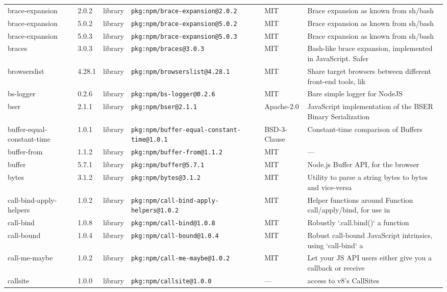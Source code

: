 \documentclass[11pt]{article}
\begin{document}
\begin{longtable}{|l|l|l|p{2.2cm}|l|p{4cm}|}
brace-expansion & 2.0.2 & library & \texttt{pkg:npm/brace-expansion@2.0.2} & MIT & Brace expansion as known from sh/bash \\
brace-expansion & 5.0.2 & library & \texttt{pkg:npm/brace-expansion@5.0.2} & MIT & Brace expansion as known from sh/bash \\
brace-expansion & 5.0.3 & library & \texttt{pkg:npm/brace-expansion@5.0.3} & MIT & Brace expansion as known from sh/bash \\
braces & 3.0.3 & library & \texttt{pkg:npm/braces@3.0.3} & MIT & Bash-like brace expansion, implemented in JavaScript. Safer  \\
browserslist & 4.28.1 & library & \texttt{pkg:npm/browserslist@4.28.1} & MIT & Share target browsers between different front-end tools, lik \\
bs-logger & 0.2.6 & library & \texttt{pkg:npm/bs-logger@0.2.6} & MIT & Bare simple logger for NodeJS \\
bser & 2.1.1 & library & \texttt{pkg:npm/bser@2.1.1} & Apache-2.0 & JavaScript implementation of the BSER Binary Serialization \\
buffer-equal-constant-time & 1.0.1 & library & \texttt{pkg:npm/buffer-equal-constant-time@1.0.1} & BSD-3-Clause & Constant-time comparison of Buffers \\
buffer-from & 1.1.2 & library & \texttt{pkg:npm/buffer-from@1.1.2} & MIT & — \\
buffer & 5.7.1 & library & \texttt{pkg:npm/buffer@5.7.1} & MIT & Node.js Buffer API, for the browser \\
bytes & 3.1.2 & library & \texttt{pkg:npm/bytes@3.1.2} & MIT & Utility to parse a string bytes to bytes and vice-versa \\
call-bind-apply-helpers & 1.0.2 & library & \texttt{pkg:npm/call-bind-apply-helpers@1.0.2} & MIT & Helper functions around Function call/apply/bind, for use in \\
call-bind & 1.0.8 & library & \texttt{pkg:npm/call-bind@1.0.8} & MIT & Robustly `.call.bind()` a function \\
call-bound & 1.0.4 & library & \texttt{pkg:npm/call-bound@1.0.4} & MIT & Robust call-bound JavaScript intrinsics, using `call-bind` a \\
call-me-maybe & 1.0.2 & library & \texttt{pkg:npm/call-me-maybe@1.0.2} & MIT & Let your JS API users either give you a callback or receive  \\
callsite & 1.0.0 & library & \texttt{pkg:npm/callsite@1.0.0} & — & access to v8's CallSites \\

\end{longtable}
\end{document}
